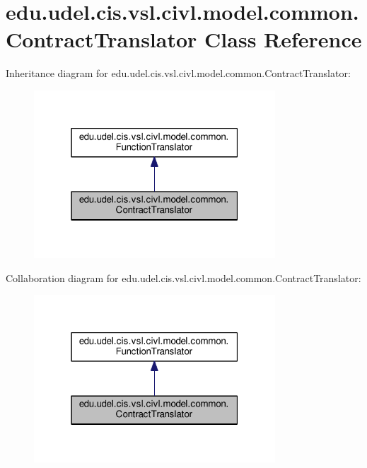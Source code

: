 \hypertarget{classedu_1_1udel_1_1cis_1_1vsl_1_1civl_1_1model_1_1common_1_1ContractTranslator}{}\section{edu.\+udel.\+cis.\+vsl.\+civl.\+model.\+common.\+Contract\+Translator Class Reference}
\label{classedu_1_1udel_1_1cis_1_1vsl_1_1civl_1_1model_1_1common_1_1ContractTranslator}


Inheritance diagram for edu.\+udel.\+cis.\+vsl.\+civl.\+model.\+common.\+Contract\+Translator\+:
\nopagebreak
\begin{figure}[H]
\begin{center}
\leavevmode
\includegraphics[width=256pt]{classedu_1_1udel_1_1cis_1_1vsl_1_1civl_1_1model_1_1common_1_1ContractTranslator__inherit__graph}
\end{center}
\end{figure}


Collaboration diagram for edu.\+udel.\+cis.\+vsl.\+civl.\+model.\+common.\+Contract\+Translator\+:
\nopagebreak
\begin{figure}[H]
\begin{center}
\leavevmode
\includegraphics[width=256pt]{classedu_1_1udel_1_1cis_1_1vsl_1_1civl_1_1model_1_1common_1_1ContractTranslator__coll__graph}
\end{center}
\end{figure}
